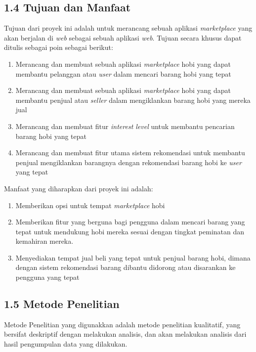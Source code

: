 \documentclass[a4paper]{article}
\begin{document}
\subsection*{1.4 Tujuan dan Manfaat}

Tujuan dari proyek ini adalah untuk merancang sebuah aplikasi \textit{marketplace} yang akan berjalan di \textit{web} sebagai sebuah aplikasi \textit{web}. Tujuan secara khusus dapat ditulis sebagai poin sebagai berikut:
\begin{enumerate}
    \item Merancang dan membuat sebuah aplikasi \textit{marketplace} hobi yang dapat membantu pelanggan atau \textit{user} dalam mencari barang hobi yang tepat
    \item Merancang dan membuat sebuah aplikasi \textit{marketplace} hobi yang dapat membantu penjual atau \textit{seller} dalam mengiklankan barang hobi yang mereka jual
    \item Merancang dan membuat fitur \textit{interest level} untuk membantu pencarian barang hobi yang tepat
    \item Merancang dan membuat fitur utama sistem rekomendasi untuk membantu penjual mengiklankan barangnya dengan rekomendasi barang hobi ke \textit{user} yang tepat
\end{enumerate}

Manfaat yang diharapkan dari proyek ini adalah:
\begin{enumerate}
    \item Memberikan opsi untuk tempat \textit{marketplace} hobi
    \item Memberikan fitur yang berguna bagi pengguna dalam mencari barang yang tepat untuk mendukung hobi mereka sesuai dengan tingkat peminatan dan kemahiran mereka.
    \item Menyediakan tempat jual beli yang tepat untuk penjual barang hobi, dimana dengan sistem rekomendasi barang dibantu didorong atau disarankan ke pengguna yang tepat
\end{enumerate}

\subsection*{1.5 Metode Penelitian}

Metode Penelitian yang digunakkan adalah metode penelitian kualitatif, yang bersifat deskriptif dengan melakukan analisis\autocite{pengajar-kualitatif}, dan akan melakukan analisis dari hasil pengumpulan data yang dilakukan.
\end{document}

